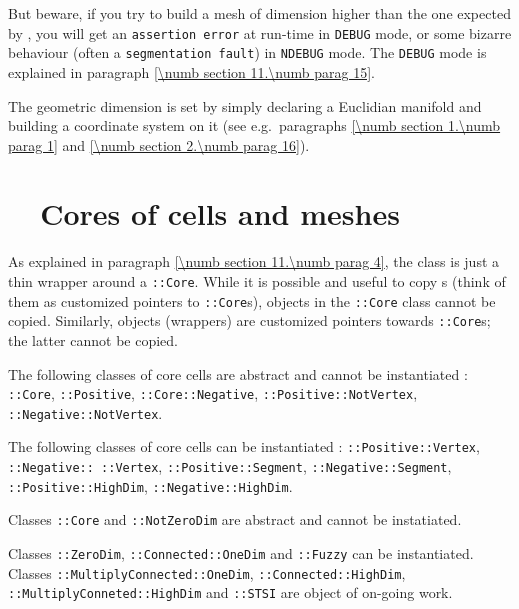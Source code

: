 But beware, if you try to build a mesh of dimension higher than the one expected by
\maniFEM, you will get an {\small\tt assertion error} at run-time in {\small\tt DEBUG} mode,
or some bizarre behaviour (often a {\small\tt segmentation fault}) in {\small\tt NDEBUG} mode.
The {\small\tt DEBUG} mode is explained in paragraph \ref{\numb section 11.\numb parag 15}.

The geometric dimension is set by simply declaring a Euclidian manifold and building
a coordinate system on it (see e.g.\ paragraphs \ref{\numb section 1.\numb parag 1}
and \ref{\numb section 2.\numb parag 16}).


\section{~~Cores of cells and meshes}\label{\numb section 11.\numb parag 8}

As explained in paragraph \ref{\numb section 11.\numb parag 4}, the {\small\tt {}}
class is just a thin wrapper around a {\small\tt {}::Core}.
While it is possible and useful to copy {\small\tt {}}s (think of them as customized
pointers to {\small\tt {}::Core}s), objects in the {\small\tt {}::Core}
class cannot be copied.
Similarly, {\small\tt {}} objects (wrappers) are customized pointers towards
{\small\tt {}::Core}s; the latter cannot be copied.

The following classes of core cells are abstract and cannot be instantiated :
{\small\tt {}::Core}, {\small\tt {}::Positive},
{\small\tt {}::Core::Negative}, {\small\tt {}::Positive::NotVertex},
{\small\tt {}::Negative::NotVertex}.

The following classes of core cells can be instantiated :
{\small\tt {}::Positive::Vertex}, {\small\tt {}::Negative:: ::Vertex},
{\small\tt {}::Positive::Segment}, {\small\tt {}::Negative::Segment},
{\small\tt {}::Positive::HighDim},\break
{\small\tt {}::Negative::HighDim}.

Classes {\small\tt {}::Core} and {\small\tt {}::NotZeroDim} are abstract
and cannot be instatiated.

Classes {\small\tt {}::ZeroDim}, {\small\tt {}::Connected::OneDim} and
{\small\tt {}::Fuzzy} can be instantiated.
Classes {\small\tt {}::MultiplyConnected::OneDim},
{\small\tt {}::Connected::HighDim}, {\small\tt {}::MultiplyConneted::HighDim}
and {\small\tt {}::STSI} are object of on-going work.

